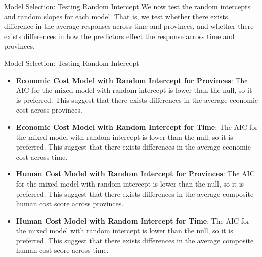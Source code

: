 \begin{frame}{Model Selection: Testing Random Intercept}
We now test the random intercepts and random slopes for each model. That is, we test whether there exists difference in the average responses across time and provinces, and whether there exists differences in how the predictors effect the response across time and provinces.
    
\end{frame}

\begin{frame}{Model Selection: Testing Random Intercept}
\begin{itemize}
	\item \textbf{Economic Cost Model with Random Intercept for Provinces}: The AIC for the mixed model with random intercept is lower than the null, so it is preferred. This suggest that there exists differences in the average economic cost across provinces.
	\item \textbf{Economic Cost Model with Random Intercept for Time}: The AIC for the mixed model with random intercept is lower than the null, so it is preferred. This suggest that there exists differences in the average economic cost across time.
	\item \textbf{Human Cost Model with Random Intercept for Provinces}: The AIC for the mixed model with random intercept is lower than the null, so it is preferred. This suggest that there exists differences in the average composite human cost score across provinces.
	\item \textbf{Human Cost Model with Random Intercept for Time}: The AIC for the mixed model with random intercept is lower than the null, so it is preferred. This suggest that there exists differences in the average composite human cost score across time.
\end{itemize}
 
\end{frame}

